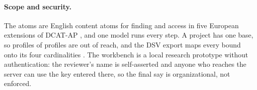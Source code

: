 \paragraph{Scope and security.}
The atoms are English content atoms for finding and access in five European extensions of \ac{DCAT-AP} %
\cite{anon2027rq1}, and one model runs every step.
A project has one base, so profiles of profiles are out of reach, and the \ac{DSV} export maps every bound onto %
its four cardinalities \cite{klimek2026dsv}.
The workbench is a local research prototype without authentication: the reviewer's name is self-asserted and %
anyone who reaches the server can use the key entered there, so the final say is organizational, not enforced.
